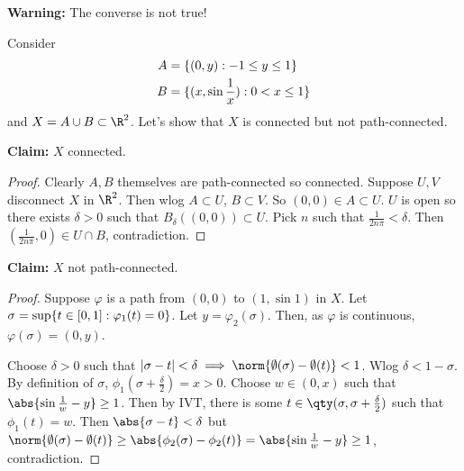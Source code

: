 \textbf{\color{red} Warning:} The converse is not true!
\begin{example}
Consider 
\begin{align*}
    A &= \{(0,y) : -1\leq y \leq 1\}\\
    B &= \{(x,\sin \frac{1}{x}) : 0< x\leq 1\}
\end{align*}
and $X = A\cup B \subset \R^2$. Let's show that $X$ is connected but not path-connected.
\end{example}
\textbf{\color{red} Claim:} $X$ connected.
\begin{proof}
Clearly $A,B$ themselves are path-connected so connected. Suppose $U,V$ disconnect $X$ in $\R^2$. Then wlog $A\subset U$, $B\subset V$. So $(0,0)\in A\subset U$. $U$ is open so there exists $\delta>0$ such that $B_\delta((0,0))\subset U$. Pick $n$ such that $\frac{1}{2n\pi}<\delta$. Then $(\frac{1}{2n\pi},0)\in U\cap B$, contradiction.
\end{proof}
\textbf{\color{red} Claim:} $X$ not path-connected.
\begin{proof}
Suppose $\varphi$ is a path from $(0,0)$ to $(1,\sin 1)$ in $X$. Let $\sigma = \sup\{t\in [0,1] : \varphi_1(t) = 0\}$. Let $y = \varphi_2(\sigma).$ Then, as $\varphi$ is continuous, $\varphi(\sigma) = (0,y)$.

Choose $\delta > 0$ such that $|\sigma - t| <\delta \implies \norm{\emptyset(\sigma) - \emptyset(t)} < 1$. Wlog $\delta < 1-\sigma$. By definition of $\sigma$, $\phi_1(\sigma + \frac{\delta}{2}) = x > 0$. Choose $w\in (0,x)$ such that $\abs{\sin \frac{1}{w} - y} \geq 1$. Then by IVT, there is some $t\in \qty(\sigma, \sigma +\frac{\delta}{2})$ such that $\phi_1(t) = w$. Then $\abs{\sigma - t} < \delta$ but $\norm{\emptyset(\sigma) - \emptyset(t)} \geq \abs{\phi_2(\sigma) - \phi_2(t)} = \abs{\sin\frac{1}{w} - y} \geq 1$, contradiction.
\end{proof}


